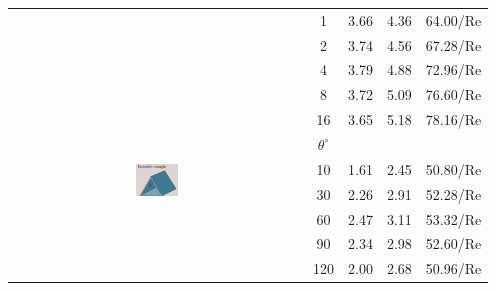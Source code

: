 \documentclass[10pt]{article}
\begin{document}
\begin{table}[h]
\begin{tabular}{ccccc}
        & 1 & 3.66 & 4.36 & 64.00/Re \\
        & 2 & 3.74 & 4.56 & 67.28/Re \\
        & 4 & 3.79 & 4.88 & 72.96/Re \\
        & 8 & 3.72 & 5.09 & 76.60/Re \\
        & 16 & 3.65 & 5.18 & 78.16/Re \\
        \hline
        & \underline{$\theta^\circ$} & & & \\
        \multirow{2}{*}{\includegraphics[width=0.15\textwidth]{Figures/Sec8 Triangle Fully Laminar.png}}
        & 10 & 1.61 & 2.45 & 50.80/Re \\
        & 30 & 2.26 & 2.91 & 52.28/Re \\
        & 60 & 2.47 & 3.11 & 53.32/Re \\
        & 90 & 2.34 & 2.98 & 52.60/Re \\
        & 120 & 2.00 & 2.68 & 50.96/Re \\
        \hline
    \end{tabular}
\end{table}

\end{document}
